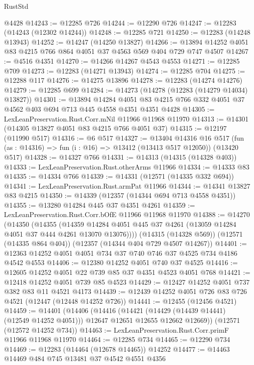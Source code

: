 \begin{lexlean}{RustStd}
\begin{coremodule}
    @4428
@14243 := @12285 @726
@14244 := @12290 @726
@14247 := @12283 (@14243 (@12302 @14244))
@14248 := @12285 @721
@14250 := @12283 (@14248 @13943)
@14252 := @14247 (@14250 @13827)
@14266 := @13894 @14252 @4051 @83 @4215 @766 @864 @4051 @37 @4563 @569 @404 @729 @747 @4507
@14267 := @4516 @4351
@14270 := @14266 @14267 @4543 @4553
@14271 := @12285 @709
@14273 := @12283 (@14271 @13943)
@14274 := @12285 @704
@14275 := @12288 @117
@14276 := @14275 @13896
@14278 := @12283 (@14274 @14276)
@14279 := @12285 @699
@14284 := @14273 (@14278 (@12283 (@14279 @14034) @13827))
@14301 := @13894
    @14284
    @4051
    @83
    @4215
    @766
    @332
    @4051
    @37
    @4562
    @403
    @694
    @713
    @445
    @4558
    @4351
    @4351
    @4428
@14305 := LexLeanPreservation.Rust.Corr.mNil @11966 @11968 @11970
@14313 := @14301 (@14305 @13827 @4051 @83 @4215 @766 @4051 @37)
@14315 := @12197 (@11990 @517)
@14316 := @6 @517
@14327 := @13404
    @14316
    @16
    @517
    (fun (as : @14316) => fun (i : @16) => @13412 (@13413 @517 @12050))
    (@13420 @517)
@14328 := @14327 @766
@14331 := @14313 (@14315 (@14328 @403))
@14333 := LexLeanPreservation.Rust.otherArms @11966
@14334 := @14333 @83
@14335 := @14334 @766
@14339 := @14331 (@12571 (@14335 @332 @694))
@14341 := LexLeanPreservation.Rust.armPat @11966
@14344 := @14341 @13827 @83 @4215
@14350 := @14339 (@12357 (@14344 @694 @713 @4558 @4351))
@14355 := @13280 @14284 @445 @37 @4351 @4261
@14359 := LexLeanPreservation.Rust.Corr.bOfE @11966 @11968 @11970
@14388 := @14270
    (@14350
      (@14355
        (@14359 @14284 @4051 @445 @37 @4261 (@13059 @14284 @4051 @37 @444 @4261 @13070 @13076))))
    (@14315 (@14328 @569))
    (@12571 (@14335 @864 @404))
    (@12357 (@14344 @404 @729 @4507 @14267))
@14401 := @12363 @14252 @4051 @4051 @734 @37 @740 @746 @37 @4525 @734 @4186 @4542 @4553
@14406 := @12380 @14252 @4051 @740 @37 @4525
@14416 := @12605 @14252 @4051 @22 @739 @85 @37 @4351 @4523 @4051 @768
@14421 := @12418 @14252 @4051 @739 @85 @4523
@14429 := @12427 @14252 @4051 @737 @382 @83 @11 @4521 @4173
@14439 := @12439 @14252 @4051 @726 @83 @726 @4521 (@12447 (@12448 @14252 @726))
@14441 := @12455 (@12456 @4521)
@14459 := @14401
    (@14406
      (@14416
        (@14421 (@14429 (@14439 @14441) (@12549 @14252 @4051)))
        @12647
        @12651
        @12655
        @12662
        @12669))
    (@12571 (@12572 @14252 @734))
@14463 := LexLeanPreservation.Rust.Corr.primF @11966 @11968 @11970
@14464 := @12285 @734
@14465 := @12290 @734
@14469 := @12283 (@14464 (@12678 @14465)) @14252
@14477 := @14463 @14469 @484 @745 @13481 @37 @4542 @4551 @4356

\end{coremodule}
\end{lexlean}
